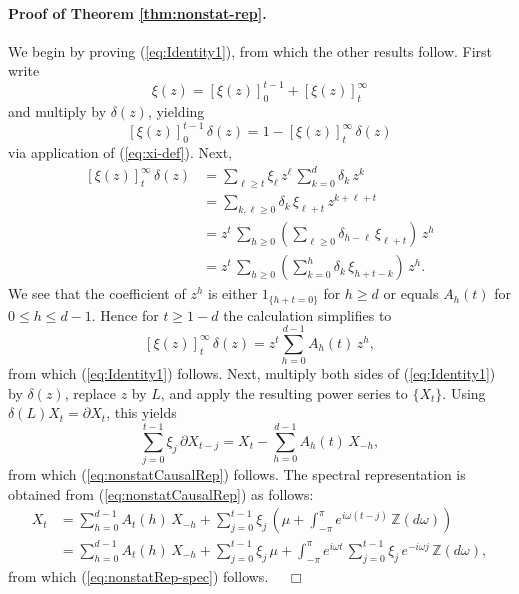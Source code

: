 \documentclass[a4paper]{book}
\def\ZZ{\mathbb Z}
\begin{document}
\paragraph{Proof of Theorem  \ref{thm:nonstat-rep}.}  
  We begin by proving (\ref{eq:Identity1}), from which the other results follow.
 First write
 \[
  \xi (z) = {[ \xi (z) ]}_0^{t-1} + {[ \xi (z)]}_t^{\infty}
 \]
  and multiply by $\delta (z)$, yielding
\[
  {[ \xi (z) ]}_0^{t-1} \, \delta (z) = 1 -  {[ \xi (z)]}_t^{\infty}  \, \delta (z)
\]
via application of (\ref{eq:xi-def}).  Next, 
\begin{align*}
  {[ \xi (z)]}_t^{\infty}  \, \delta (z) & = 
     \sum_{\ell \geq t} \xi_{\ell} \, z^{\ell}
     \, \sum_{k=0}^d \delta_k \, z^k \\
  & =   \sum_{k, \ell \geq 0} \delta_k \, \xi_{\ell+t} \, z^{k+\ell+t}  \\
  & = z^t \, \sum_{h \geq 0}  \left( \sum_{\ell \geq 0} 
  \delta_{h-\ell} \, \xi_{\ell+t} \right) \, z^h \\
    & = z^t \, \sum_{h \geq 0}  \left( \sum_{k=0}^h 
  \delta_{k} \, \xi_{h+t-k} \right) \, z^h.
\end{align*}
 We see that the coefficient of $z^h$ is either $1_{ \{ h+t =0 \} }$ for $h \geq d$
  or equals $A_h (t)$ for $0 \leq h \leq d-1$.  Hence for $t \geq 1-d$ the calculation
  simplifies to
\[
 {[ \xi (z)]}_t^{\infty}  \, \delta (z) =  z^t \sum_{h=0}^{d-1} A_h (t) \, z^h,
\]
 from which  (\ref{eq:Identity1}) follows. 
 Next, multiply both sides of (\ref{eq:Identity1}) by $\delta (z)$, replace $z$ by $L$,
  and apply the resulting power series to $\{ X_t \}$.  Using
  $\delta (L) X_t = \partial X_t$, this yields
  \[
   \sum_{j=0}^{t-1} \xi_j \, \partial X_{t-j} = 
    X_t - \sum_{h=0}^{d-1} A_{h} (t) \, X_{-h},
\]
 from which (\ref{eq:nonstatCausalRep}) follows.  The spectral representation is
  obtained from (\ref{eq:nonstatCausalRep}) as follows:
\begin{align*}
 X_t  & = \sum_{h=0}^{d-1} A_{t} (h) \, X_{-h} + 
  \sum_{j=0}^{t-1} \xi_j \,  \left( \mu + 
  \int_{-\pi}^{\pi} e^{i \omega (t-j)}  \, \ZZ (d\omega) \right) \\
  & = \sum_{h=0}^{d-1} A_{t} (h) \, X_{-h} + 
  \sum_{j=0}^{t-1} \xi_j \, \mu  +
    \int_{-\pi}^{\pi} e^{i \omega t } \, \sum_{j=0}^{t-1} \xi_j \,e^{-i \omega j}
    \, \ZZ (d\omega),
\end{align*}
  from which (\ref{eq:nonstatRep-spec}) follows.  $\quad \Box$
 
\end{document}
